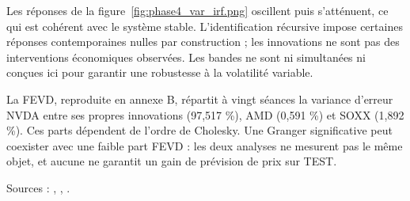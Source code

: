 Les réponses de la figure~\ref{fig:phase4_var_irf.png} oscillent puis s’atténuent, ce qui est cohérent avec le système stable. L’identification récursive impose certaines réponses contemporaines nulles par construction ; les innovations ne sont pas des interventions économiques observées. Les bandes ne sont ni simultanées ni conçues ici pour garantir une robustesse à la volatilité variable.



La FEVD, reproduite en annexe B, répartit à vingt séances la variance d’erreur NVDA entre ses propres innovations (97,517 \%), AMD (0,591 \%) et SOXX (1,892 \%). Ces parts dépendent de l’ordre de Cholesky. Une Granger significative peut coexister avec une faible part FEVD : les deux analyses ne mesurent pas le même objet, et aucune ne garantit un gain de prévision de prix sur TEST.



Sources : , , .


